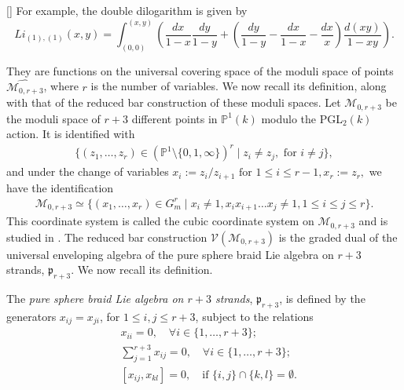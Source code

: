 \documentclass[a4paper,fleqn]{cas-sc}
\begin{document}
\begin{ex}\label{ex:dilog}[\cite{Zhao}]  
For example, the double dilogarithm is given by
\begin{equation}\label{eq:diloga}
Li_{(1),(1)}(x,y) = \int_{(0,0)}^{(x,y)} \left( \frac{dx}{1-x} \frac{dy}{1-y} + \left( \frac{dy}{1-y} - \frac{dx}{1-x} - \frac{dx}{x} \right) \frac{d(xy)}{1 - xy} \right).
\end{equation}
\end{ex}

They are functions on the universal covering space of the moduli space of points $\widehat{\mathcal{M}_{0,r+3}}$, where $r$ is the number of variables. We now recall its definition, along with that of the reduced bar construction of these moduli spaces. Let $\mathcal{M}_{0,r+3}$ be the moduli space of $r+3$ different points in $\mathbb{P}^1(k)$ modulo the PGL$_2(k)$ action. It is identified with 
\begin{align*}
\{(z_1,\ldots,z_r)\in (\mathbb{P}^1\setminus \{0,1,\infty\})^r \mid z_i\ne z_j, \text{ for }i\ne j\},
\end{align*}
and under the change of variables
$
x_i:=z_i/z_{i+1} \text{ for } 1\le i\le r-1, x_r:=z_r,
$
we have the identification
\begin{align*}
\mathcal{M}_{0,r+3}\simeq\{(x_1,\ldots,x_r)\in G^{r}_{m} \mid x_i\ne 1, x_{i}x_{i+1}\dots x_{j}\ne 1, 1\le i\le j\le  r\}.
\end{align*}
This coordinate system is called the cubic coordinate system on $\mathcal{M}_{0,r+3}$ and is studied in \cite{Brown2009}. The reduced bar construction
$\mathcal{V}(\mathcal{M}_{0,r+3})$ is the graded dual of the universal enveloping algebra of the pure sphere braid Lie algebra on $r+3$ strands, $\mathfrak{p}_{r+3}$. We now recall its definition.

\begin{definition} \label{def:pure-shere-braid}
    The \textit{pure sphere braid Lie algebra on $r+3$ strands}, $\mathfrak{p}_{r+3}$, is defined by the generators $x_{ij} = x_{ji}$, for $1 \leq i,j \leq r+3$, subject to the relations
    \begin{equation*}
        \begin{split}
            & x_{ii} =0, \quad \forall i \in \{1, \ldots, r+3\}; \\
            & \sum_{j=1}^{r+3} x_{ij} = 0, \quad \forall i \in \{1, \ldots, r+3\}; \\
            & [x_{ij},x_{kl}] = 0, \quad \text{if } \{i,j\} \cap \{k,l\} = \emptyset.
        \end{split}
    \end{equation*}
\end{definition}
\end{document}
